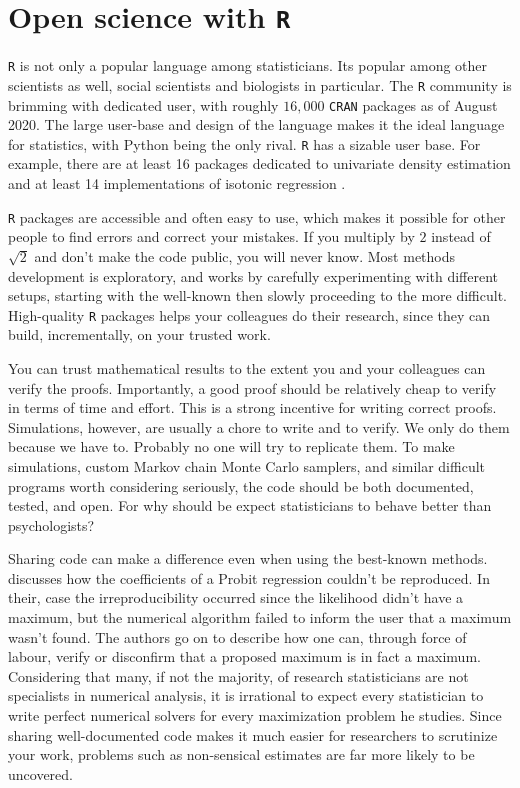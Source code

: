 \section{Open science with \texttt{R}}

\texttt{R} is not only a popular language among statisticians. Its popular among other scientists as well, social scientists and biologists in particular. The \texttt{R} community is brimming with dedicated user, with roughly $16,000$ \texttt{CRAN} packages as of August 2020. The large user-base and design of the language makes it the ideal language for statistics, with Python being the only rival. \texttt{R} has a sizable user base. For example, there are at least 16 packages dedicated to univariate density estimation \parencite{Deng2011-bk} and at least 14 implementations of isotonic regression \parencite{Busing2019-tv}. 

\texttt{R} packages are accessible and often easy to use, which makes it possible for other people to find errors and correct your mistakes. If you multiply by $2$ instead of $\sqrt{2}$ and don't make the code public, you will never know. Most methods development is exploratory, and works by carefully experimenting with different setups, starting with the well-known then slowly proceeding to the more difficult. High-quality \texttt{R} packages helps your colleagues do their research, since they can build, incrementally, on your trusted work.  

You can trust mathematical results to the extent you and your colleagues can verify the proofs. Importantly, a good proof should be relatively cheap to verify in terms of time and effort. This is a strong incentive for writing correct proofs. Simulations, however, are usually a chore to write and to verify. We only do them because we have to. Probably no one will try to replicate them. To make simulations, custom Markov chain Monte Carlo samplers, and similar difficult programs worth considering seriously, the code should be both documented, tested, and open. For why should be expect statisticians to behave better than psychologists?

Sharing code can make a difference even when using the best-known methods. \textcite{McCullough2003-zd} discusses how the coefficients of a Probit regression couldn't be reproduced. In their, case the irreproducibility occurred since the likelihood didn't have a maximum, but the numerical algorithm failed to inform the user that a maximum wasn't found. The authors go on to describe how one can, through force of labour, verify or disconfirm that a proposed maximum is in fact a maximum. Considering that many, if not the majority, of research statisticians are not specialists in numerical analysis, it is irrational to expect every statistician to write perfect numerical solvers for every maximization problem he studies. Since sharing well-documented code makes it much easier for researchers to scrutinize your work, problems such as non-sensical estimates are far more likely to be uncovered.

